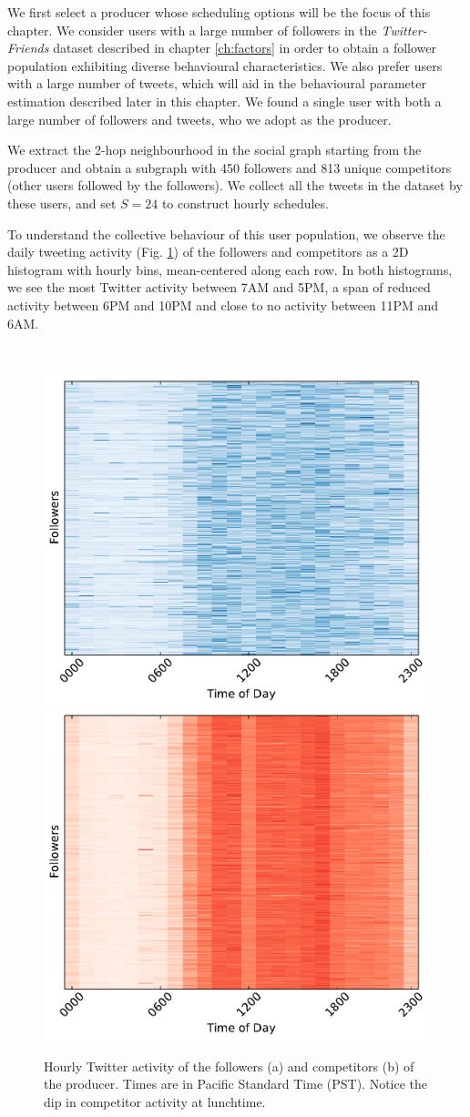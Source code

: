 \documentclass[onesided,letterpaper]{tufte-book}
\begin{document}
\newpage

We first select a producer whose scheduling options will be the focus of this chapter. We consider users with a large number of followers in the \textit{Twitter-Friends} dataset described in chapter \ref{ch:factors} in order to obtain a follower population exhibiting diverse behavioural characteristics. We also prefer users with a large number of tweets, which will aid in the behavioural parameter estimation described later in this chapter. We found a single user with both a large number of followers and tweets, who we adopt as the producer.

We extract the 2-hop neighbourhood in the social graph starting from the producer and obtain a subgraph with 450 followers and 813 unique competitors (other users followed by the followers). We collect all the tweets in the dataset by these users, and set $S = 24$ to construct hourly schedules.

To understand the collective behaviour of this user population, we observe the daily tweeting activity (Fig. \ref{fig:follower-competitor}) of the followers and competitors as a 2D histogram with hourly bins, mean-centered along each row. In both histograms, we see the most Twitter activity between 7AM and 5PM, a span of reduced activity between 6PM and 10PM and close to no activity between 11PM and 6AM.

\\[2pc]

\begin{figure}
        \includegraphics[width=0.5\linewidth]{follower_heatmap}
        \includegraphics[width=0.5\linewidth]{competitor_heatmap}
    \caption[Hourly Twitter activity of followers and competitors.]{Hourly Twitter activity of the followers (a) and competitors (b) of the producer. Times are in Pacific Standard Time (PST). Notice the dip in competitor activity at lunchtime.}
    \label{fig:follower-competitor}
\end{figure}
\end{document}
